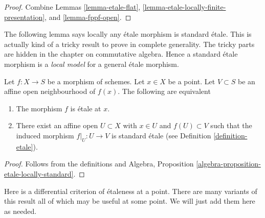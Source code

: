 \begin{proof}
Combine Lemmas \ref{lemma-etale-flat},
\ref{lemma-etale-locally-finite-presentation}, and
\ref{lemma-fppf-open}.
\end{proof}

\noindent
The following lemma says locally any \'etale morphism is standard \'etale.
This is actually kind of a tricky result to prove in complete generality.
The tricky parts are hidden in the chapter on commutative algebra.
Hence a standard \'etale morphism is a {\it local model} for a general
\'etale morphism.

\begin{lemma}
\label{lemma-etale-locally-standard-etale}
Let $f : X  \to S$ be a morphism of schemes.
Let $x \in X$ be a point.
Let $V \subset S$ be an affine open neighbourhood of $f(x)$.
The following are equivalent
\begin{enumerate}
\item The morphism $f$ is \'etale at $x$.
\item There exist an affine open $U \subset X$ with
$x \in U$ and $f(U) \subset V$ such that the
induced morphism $f|_U : U \to V$ is standard \'etale
(see Definition \ref{definition-etale}).
\end{enumerate}
\end{lemma}

\begin{proof}
Follows from the definitions and
Algebra, Proposition \ref{algebra-proposition-etale-locally-standard}.
\end{proof}

\noindent
Here is a differential criterion of \'etaleness at a point.
There are many variants of this result
all of which may be useful at some point. We will just add them
here as needed.


